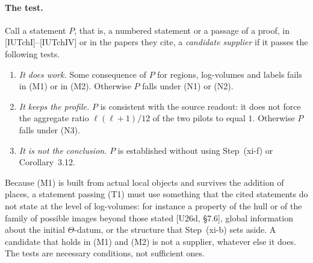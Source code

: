 \documentclass[11pt]{article}
\theoremstyle{definition}
\begin{document}
\paragraph{The test.}  Call a statement $P$, that is, a numbered statement or a passage of
a proof, in [IUTchI]--[IUTchIV] or in the papers they cite, a
\emph{candidate supplier} if it passes the following tests.
\begin{enumerate}[label=(T\arabic*),leftmargin=*]
\item \emph{It does work.}  Some consequence of $P$ for regions,
log-volumes and labels fails in (M1) or in (M2).  Otherwise $P$ falls under (N1) or (N2).
\item \emph{It keeps the profile.}  $P$ is consistent with the source
readout: it does not force the aggregate ratio $\ell(\ell+1)/12$ of
the two pilots to equal $1$.  Otherwise $P$ falls under (N3).
\item \emph{It is not the conclusion.}  $P$ is established without
using Step~(xi-f) or Corollary~3.12.
\end{enumerate}
Because (M1) is built from actual local objects and survives the
addition of places, a statement passing (T1) must use
something that the cited statements do not state at the level of
log-volumes: for instance a property of the hull or of the family of
possible images beyond those stated [U26d, \S7.6], global
information about the initial $\Theta$-datum, or the structure that
Step~(xi-b) sets aside.  A candidate that holds in (M1) and (M2) is
not a supplier, whatever else it does.  The tests are necessary
conditions, not sufficient ones.
\end{document}
